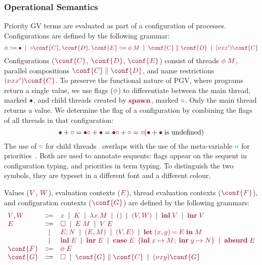 \documentclass[main.tex]{subfiles}
\begin{document}
\subsubsection*{Operational Semantics}
Priority GV terms are evaluated as part of a configuration of processes. Configurations are defined by the following grammar:
\[
  \tm{\phi}
  \Coloneqq \tm{\main}
  \sep      \tm{\child}
  \hfill
  \tm{\conf{C}}, \tm{\conf{D}}, \tm{\conf{E}}
  \Coloneqq \tm{\phi\;M}
  \sep      \tm{\ppar{\conf{C}}{\conf{D}}}
  \sep      \tm{\res{x}{x'}{\conf{C}}}
  \hfill
\]
Configurations ($\tm{\conf{C}}$, $\tm{\conf{D}}$, $\tm{\conf{E}}$) consist of threads $\tm{\phi\;M}$, parallel compositions $\tm{\ppar{\conf{C}}{\conf{D}}}$, and name restrictions $\tm{\res{x}{x'}{\conf{C}}}$. To preserve the functional nature of PGV, where programs return a single value, we use flags ($\tm{\phi}$) to differentiate between the main thread, marked $\tm{\main}$, and child threads created by $\tm{\spawn}$, marked $\tm{\child}$. Only the main thread returns a value. We determine the flag of a configuration by combining the flags of all threads in that configuration:
\[
  \tm{\main}  + \tm{\child} = \tm{\main}
  \hfill
  \tm{\child} + \tm{\main}  = \tm{\main}
  \hfill
  \tm{\child} + \tm{\child} = \tm{\child}
  \hfill
  (\tm{\main}  + \tm{\main} \; \text{is undefined})
  \hfill
\]
The use of $\tm{\child}$ for child threads~\cite{lindleymorris15} overlaps with the use of the meta-variable $\cs{o}$ for priorities~\cite{dardhagay18extended}. Both are used to annotate sequents: flags appear on the sequent in configuration typing, and priorities in term typing. To distinguish the two symbols, they are typeset in a different font and a different colour.

Values ($\tm{V}$, $\tm{W}$), evaluation contexts ($\tm{E}$), thread evaluation contexts ($\tm{\conf{F}}$), and configuration contexts ($\tm{\conf{G}}$) are defined by the following grammars:
\[
\begin{array}[t]{lcl}
  \tm{V}, \tm{W}
  & \Coloneqq & \tm{x}
    \sep        \tm{K}
    \sep        \tm{\lambda x.M}
    \sep        \tm{\unit}
    \sep        \tm{\pair{V}{W}}
    \sep        \tm{\inl{V}}
    \sep        \tm{\inr{V}} \\
  \tm{E}
  & \Coloneqq & \tm{\hole}
    \sep        \tm{E\;M}
    \sep        \tm{V\;E} \\
  & \sep      & \tm{\andthen{E}{N}}
    \sep        \tm{\pair{E}{M}}
    \sep        \tm{\pair{V}{E}}
    \sep        \tm{\letpair{x}{y}{E}{M}} \\
  & \sep      & \tm{\inl{E}}
    \sep        \tm{\inr{E}}
    \sep        \tm{\casesum{E}{x}{M}{y}{N}}
    \sep        \tm{\absurd{E}} \\
  \tm{\conf{F}}
  & \Coloneqq & \tm{\phi\;E}
  \\
  \tm{\conf{G}}
  & \Coloneqq & \tm{\hole}
    \sep        \tm{\ppar{\conf{G}}{\conf{C}}}
    \sep        \tm{\res{x}{y}{\conf{G}}}
\end{array}
\]
\end{document}
